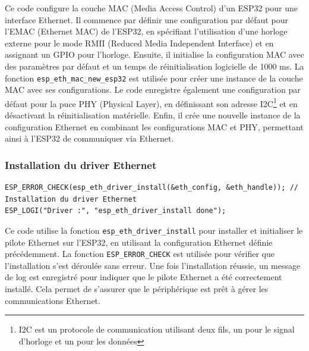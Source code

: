 \documentclass[a4paper,11pt]{article}
\begin{document}
        Ce code configure la couche MAC (Media Access Control) d'un ESP32 pour une interface Ethernet.\newline
        Il commence par définir une configuration par défaut pour l'EMAC (Ethernet MAC) de l'ESP32, en spécifiant l'utilisation d'une horloge externe pour le mode RMII (Reduced Media Independent Interface) et en assignant un GPIO pour l'horloge.\newline
        Ensuite, il initialise la configuration MAC avec des paramètres par défaut et un temps de réinitialisation logicielle de 1000 ms.\newline
        La fonction \texttt{esp\_eth\_mac\_new\_esp32} est utilisée pour créer une instance de la couche MAC avec ses configurations.\newline
        Le code enregistre également une configuration par défaut pour la puce PHY (Physical Layer), en définissant son adresse I2C\footnote{I2C est un protocole de communication utilisant deux fils, un pour le signal d'horloge et un pour les données} et en désactivant la réinitialisation matérielle.\newline 
        Enfin, il crée une nouvelle instance de la configuration Ethernet en combinant les configurations MAC et PHY, permettant ainsi à l'ESP32 de communiquer via Ethernet.

        \newpage
        \subsubsection{Installation du driver Ethernet}
        \begin{lstlisting}[style=C, caption={Installation du driver ethernet}]
ESP_ERROR_CHECK(esp_eth_driver_install(&eth_config, &eth_handle)); // Installation du driver Ethernet
ESP_LOGI("Driver :", "esp_eth_driver_install done");
        \end{lstlisting}
        \vspace{0.5cm}
        Ce code utilise la fonction \texttt{esp\_eth\_driver\_install} pour installer et initialiser le pilote Ethernet sur l'ESP32, en utilisant la configuration Ethernet définie précédemment.\newline
        La fonction \texttt{ESP\_ERROR\_CHECK} est utilisée pour vérifier que l'installation s'est déroulée sans erreur.\newline
        Une fois l'installation réussie, un message de log est enregistré pour indiquer que le pilote Ethernet a été correctement installé.\newline 
        Cela permet de s'assurer que le périphérique est prêt à gérer les communications Ethernet.
\end{document}
